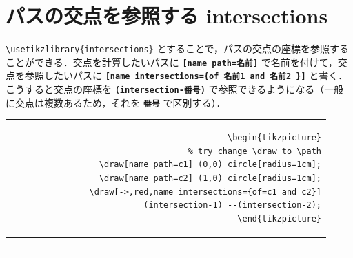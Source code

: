 \documentclass[lualatex]{jlreq}
\begin{document}
\section{パスの交点を参照する intersections}

\verb|\usetikzlibrary{intersections}| とすることで，パスの交点の座標を参照することができる．交点を計算したいパスに \textbf{\texttt{[name path=名前]}} で名前を付けて，交点を参照したいパスに \textbf{\texttt{[name intersections=\{of 名前1 and 名前2 \}]}} と書く．こうすると交点の座標を \textbf{\texttt{(intersection-番号)}} で参照できるようになる（一般に交点は複数あるため，それを \textbf{\texttt{番号}} で区別する）．
\\[0.5em]
\begin{minipage}{0.58 \textwidth}
    \begin{flushright}
        \begin{tabular}{r}
            \begin{lstlisting}[language={[LaTeX] TeX},
            numbers=none,breaklines=true,gobble=12,frame=none]
            \begin{tikzpicture}
                % try change \draw to \path
                \draw[name path=c1] (0,0) circle[radius=1cm];
                \draw[name path=c2] (1,0) circle[radius=1cm];
                \draw[->,red,name intersections={of=c1 and c2}]
                    (intersection-1) --(intersection-2);
            \end{tikzpicture}
            \end{lstlisting}
        \end{tabular}
    \end{flushright}
\end{minipage}
\hfill
\begin{minipage}{0.34 \textwidth}
    \begin{flushleft}
        \begin{tabular}{l}
            \begin{tikzpicture}
                \draw[name path=c1] (0,0) circle[radius=1cm];
                \draw[name path=c2] (1,0) circle[radius=1cm];
                \draw[->,red,name intersections={of=c1 and c2}]
                (intersection-1) --(intersection-2);
            \end{tikzpicture}
        \end{tabular}
    \end{flushleft}
\end{minipage}
\\[1em]
\end{document}
